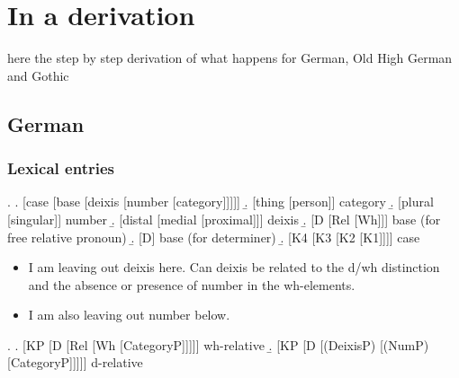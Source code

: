 
\chapter{In a derivation}

here the step by step derivation of what happens for German, Old High German and Gothic



\section{German}

\subsection{Lexical entries}

\ex. \a. [case [base [deixis [number [category]]]]]
\b. [thing [person]] \hfill category
\b. [plural [singular]] \hfill number
\b. [distal [medial [proximal]]] \hfill deixis
\b. [D [Rel [Wh]]] \hfill base (for free relative pronoun)
\b. [D] \hfill base (for determiner)
\b. [K4 [K3 [K2 [K1]]]] \hfill case

\begin{itemize}
  \item I am leaving out deixis here. Can deixis be related to the d/wh distinction and the absence or presence of number in the wh-elements.
  \item I am also leaving out number below.
\end{itemize}


\ex. \a. [KP [D [Rel [Wh [CategoryP]]]]] \hfill wh-relative
\b. [KP [D [(DeixisP) [(NumP) [CategoryP]]]]]  \hfill d-relative


